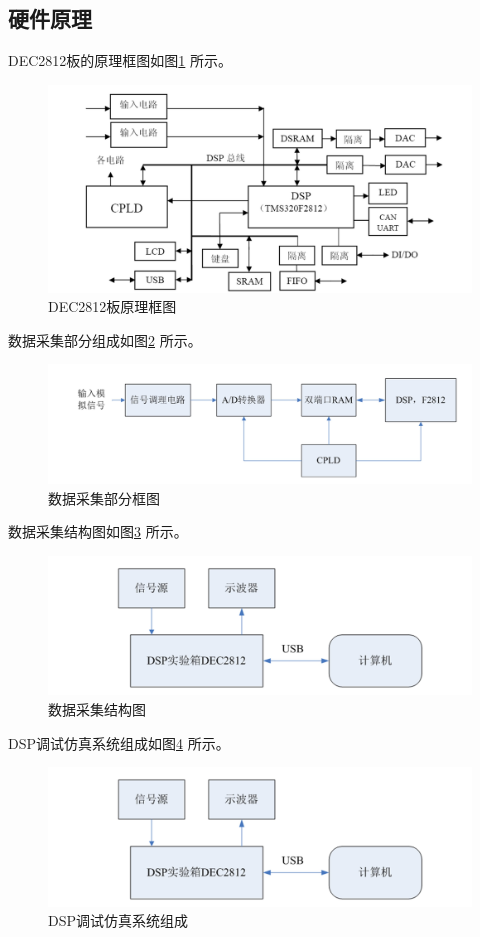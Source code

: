 \documentclass[12pt]{article}
\begin{document}
\subsection{硬件原理}
DEC2812板的原理框图如图\ref{ylkt}
所示。
\begin{figure}[htbp]
  \centering
  \includegraphics[width=\textwidth]{PPT02}
  \caption{DEC2812板原理框图}\label{ylkt}
\end{figure}\par
数据采集部分组成如图\ref{sjcjkt}
所示。
\begin{figure}[htbp]
  \centering
  \includegraphics[width=\textwidth]{PPT05}
  \caption{数据采集部分框图}\label{sjcjkt}
\end{figure}\par
数据采集结构图如图\ref{sjcjjgt}
所示。
\begin{figure}[htbp]
  \centering
  \includegraphics[width=\textwidth]{PPT06}
  \caption{数据采集结构图}\label{sjcjjgt}
\end{figure}\par
DSP调试仿真系统组成如图\ref{DSPts}
所示。
\begin{figure}[htbp]
  \centering
  \includegraphics[width=\textwidth]{PPT06}
  \caption{DSP调试仿真系统组成}\label{DSPts}
\end{figure}
\end{document}
